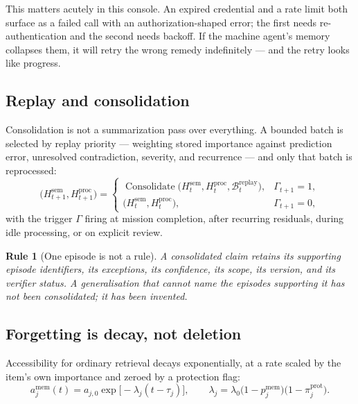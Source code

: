 \documentclass[11pt]{article}
\newtheorem{drule}{Rule}
\newcommand{\op}[1]{\operatorname{#1}}
\begin{document}
This matters acutely in this console. An expired credential and a rate limit both surface as a failed call with an authorization-shaped error; the first needs re-authentication and the second needs backoff. If the machine agent's memory collapses them, it will retry the wrong remedy indefinitely --- and the retry looks like progress.

\subsection{Replay and consolidation}

Consolidation is not a summarization pass over everything. A bounded batch is selected by replay priority --- weighting stored importance against prediction error, unresolved contradiction, severity, and recurrence --- and only that batch is reprocessed:
\begin{equation}
\big(H^{\mathrm{sem}}_{t+1},H^{\mathrm{proc}}_{t+1}\big)=
\begin{cases}
\op{Consolidate}\big(H^{\mathrm{sem}}_t,H^{\mathrm{proc}}_t,\mathcal{B}^{\mathrm{replay}}_t\big), & \Gamma_{t+1}=1,\\[2pt]
\big(H^{\mathrm{sem}}_t,H^{\mathrm{proc}}_t\big), & \Gamma_{t+1}=0,
\end{cases}
\label{eq:consolidate}
\end{equation}
with the trigger $\Gamma$ firing at mission completion, after recurring residuals, during idle processing, or on explicit review.

\begin{drule}[One episode is not a rule]
\label{rule:onenotrule}
A consolidated claim retains its supporting episode identifiers, its exceptions, its confidence, its scope, its version, and its verifier status. A generalisation that cannot name the episodes supporting it has not been consolidated; it has been invented.
\end{drule}

\subsection{Forgetting is decay, not deletion}

Accessibility for ordinary retrieval decays exponentially, at a rate scaled by the item's own importance and zeroed by a protection flag:
\begin{equation}
a^{\mathrm{mem}}_j(t)=a_{j,0}\exp\!\big[-\lambda_j(t-\tau_j)\big],
\qquad
\lambda_j=\lambda_0\big(1-p^{\mathrm{mem}}_j\big)\big(1-\pi^{\mathrm{prot}}_j\big).
\label{eq:decay}
\end{equation}
\end{document}

